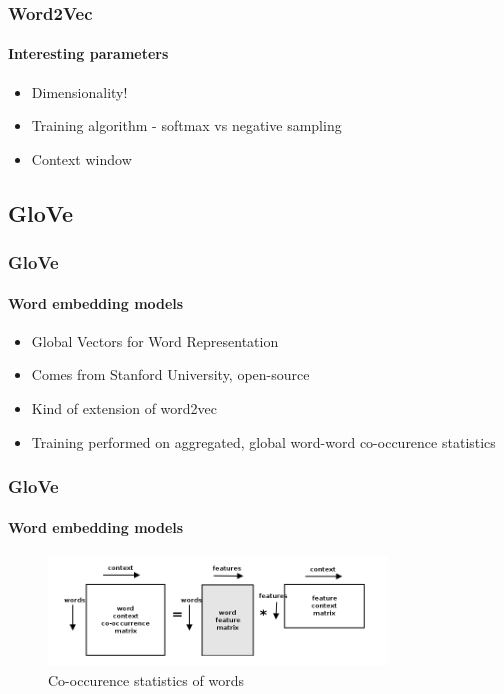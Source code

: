 \begin{frame}
\frametitle{Word2Vec}
	\framesubtitle{Interesting parameters}

	\begin{itemize}
		\item Dimensionality!
		\item Training algorithm - softmax vs negative sampling
		\item Context window
	\end{itemize}

\end{frame}


\subsection{GloVe}


\begin{frame}
\frametitle{GloVe}
	\framesubtitle{Word embedding models}

	\begin{itemize}
		\item Global Vectors for Word Representation
		\item Comes from Stanford University, open-source
		\item Kind of extension of word2vec
		\item Training performed on aggregated, global word-word co-occurence statistics
	\end{itemize}

\end{frame}

\begin{frame}
\frametitle{GloVe}
	\framesubtitle{Word embedding models}

	\begin{figure}
		\includegraphics[width=9cm]{./figures/glove}
		\caption{Co-occurence statistics of words}
	\end{figure}

\end{frame}



